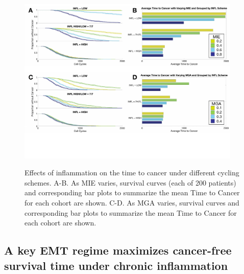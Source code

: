 \documentclass[11pt]{article}
\begin{document}
\begin{figure}
\center
{\includegraphics[width=0.95\textwidth]{Figure4/Figure4.pdf}}
\caption{Effects of inflammation on the time to cancer under different cycling schemes. A-B. As MIE varies, survival curves (each of 200 patients)  and corresponding bar plots to summarize the mean Time to Cancer for each cohort are shown. C-D. As MGA varies, survival curves  and corresponding bar plots to summarize the mean Time to Cancer for each cohort are shown.}
\label{fig:VaryINFL_and_MesPars}
\end{figure}

\subsection{A key EMT regime maximizes cancer-free survival time under chronic inflammation}\label{KeyEMT}
\end{document}
